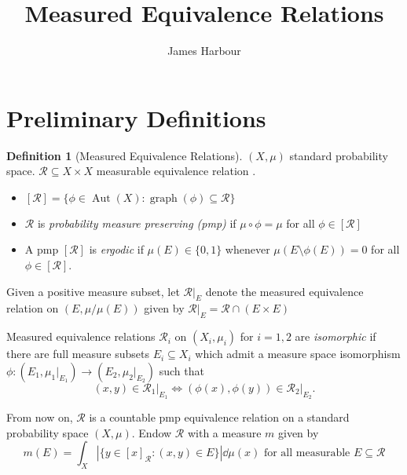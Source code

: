 \documentclass[12pt]{article}
\title{Measured Equivalence Relations}
\author{James Harbour}
\newcommand{\sub}{\subseteq}
\newcommand{\mc}[1]{\mathcal{#1}}
\DeclareMathOperator{\graph}{graph}
\DeclareMathOperator{\Aut}{Aut}
\theoremstyle{definition}
\newtheorem{definition}{Definition}[]
\theoremstyle{plain}
\theoremstyle{remark}
\begin{document}
\maketitle
\section{Preliminary Definitions}


\begin{definition}[Measured Equivalence Relations]
    $ (X,\mu) $ standard probability space. $ \mc{R}\sub X\times X $ measurable equivalence relation .
    \begin{itemize}
        \item $[\mc{R}] = \{\phi\in\Aut(X) : \graph(\phi)\sub \mc{R}\}$
        \item $ \mathcal{R} $ is \textit{probability measure preserving (pmp)} if $ \mu\circ \phi = \mu $ for all $ \phi\in[\mathcal{R}] $
        \item A pmp $ [\mathcal{R}] $ is \textit{ergodic} if $ \mu(E) \in\{0,1\} $ whenever $ \mu(E\setminus \phi(E)) = 0  $ for all $ \phi\in [\mathcal{R}] $.
    \end{itemize}

    Given a positive measure subset, let $ \mathcal{R}\vert_{E} $ denote the measured equivalence relation on $ (E,\mu/\mu(E)) $ given by $ \mathcal{R}\vert_{E} = \mathcal{R}\cap(E\times E) $ 

    Measured equivalence relations $ \mathcal{R}_{i} $ on $(X_{i},\mu_{i}) $ for $ i=1,2 $ are \textit{isomorphic} if there are full measure subsets $ E_{i}\sub X_{i} $ which admit a measure space isomorphism $ \phi:(E_{1},\mu_{1}\vert_{E_{1}})\to(E_{2},\mu_{2}\vert_{E_{2}}) $ such that
    \[
        (x,y) \in \mathcal{R}_{1}\vert_{E_{1}} \iff (\phi(x),\phi(y)) \in \mathcal{R}_{2}\vert_{E_{2}}.
    \]

    From now on, $ \mathcal{R} $ is a countable pmp equivalence relation on a standard probability space $ (X,\mu) $. Endow $ \mathcal{R} $ with a measure $ m $ given by 
    \[
        m(E) = \int_{X} |\{y\in [x]_{\mathcal{R}} : (x,y) \in E\}| \dd{\mu(x)} \text{ for all measurable } E\sub \mathcal{R}
    \]
    
\end{definition}
\end{document}
